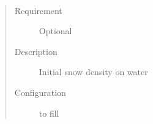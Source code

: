 \documentclass[letterpaper,10pt,english]{sphinxmanual}
\begin{document}
\begin{fulllineitems}
\label{\detokenize{input_files/Initial_Conditions/Snow_related_parameters:cmdoption-arg-snowdenswater}}~\begin{quote}\begin{description}
\item[{Requirement}] \leavevmode
Optional

\item[{Description}] \leavevmode
Initial snow density on water

\item[{Configuration}] \leavevmode
to fill

\end{description}\end{quote}

\end{fulllineitems}
\end{document}
